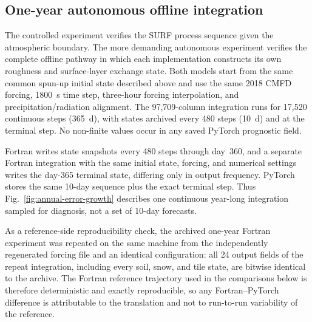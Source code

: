 \subsection{One-year autonomous offline integration}
\label{sec:annual-autonomous-equivalence}

The controlled experiment verifies the SURF process sequence given the
atmospheric boundary. The more demanding autonomous experiment verifies the
complete offline pathway in which each implementation constructs its own
roughness and surface-layer exchange state. Both models start from the same
common spun-up initial state described above and use the
same 2018 CMFD forcing, 1800~s time step, three-hour forcing interpolation,
and precipitation/radiation alignment. The 97,709-column integration runs
for 17,520 continuous steps (365~d), with states archived every 480 steps
(10~d) and at the terminal step. No non-finite values occur in any saved
PyTorch prognostic field.

Fortran writes state snapshots every 480 steps through day~360, and a separate
Fortran integration with the same initial state, forcing, and numerical settings
writes the day-365 terminal state, differing only in output frequency. PyTorch stores the same 10-day sequence plus the exact
terminal step. Thus Fig.~\ref{fig:annual-error-growth} describes one
continuous year-long integration sampled for diagnosis, not a set of 10-day
forecasts.

As a reference-side reproducibility check, the archived one-year Fortran
experiment was repeated on the same machine from the independently
regenerated forcing file and an identical configuration: all 24 output fields
of the repeat integration, including every soil, snow, and tile state,
are bitwise identical to the archive. The Fortran reference trajectory used
in the comparisons below is therefore deterministic and exactly
reproducible, so any Fortran--PyTorch difference is attributable to the
translation and not to run-to-run variability of the reference.

